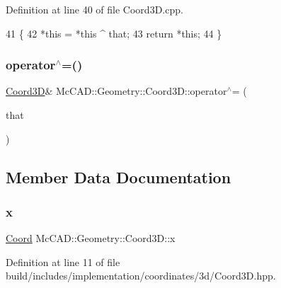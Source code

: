 Definition at line 40 of file Coord3\+D.\+cpp.


\begin{DoxyCode}
41                             \{
42     *\textcolor{keyword}{this} = *\textcolor{keyword}{this} ^ that;
43     \textcolor{keywordflow}{return} *\textcolor{keyword}{this};
44 \}
\end{DoxyCode}
\mbox{\label{classMcCAD_1_1Geometry_1_1Coord3D_ac8b374b816f081bff24770ddb51528be}} 
\subsubsection{\texorpdfstring{operator$^\wedge$=()}{operator^=()}\hspace{0.1cm}{\footnotesize\ttfamily [2/2]}}
{\footnotesize\ttfamily \hyperlink{classMcCAD_1_1Geometry_1_1Coord3D}{Coord3D}\& Mc\+C\+A\+D\+::\+Geometry\+::\+Coord3\+D\+::operator$^\wedge$= (\begin{DoxyParamCaption}\item[{const \hyperlink{classMcCAD_1_1Geometry_1_1Coord3D}{Coord3D} \&}]{that }\end{DoxyParamCaption})}



\subsection{Member Data Documentation}
\mbox{\label{classMcCAD_1_1Geometry_1_1Coord3D_a82467d541e4e330484b7f4d589b433b4}} 
\subsubsection{\texorpdfstring{x}{x}}
{\footnotesize\ttfamily \hyperlink{classMcCAD_1_1Geometry_1_1Coord}{Coord} Mc\+C\+A\+D\+::\+Geometry\+::\+Coord3\+D\+::x}



Definition at line 11 of file build/includes/implementation/coordinates/3d/\+Coord3\+D.\+hpp.

